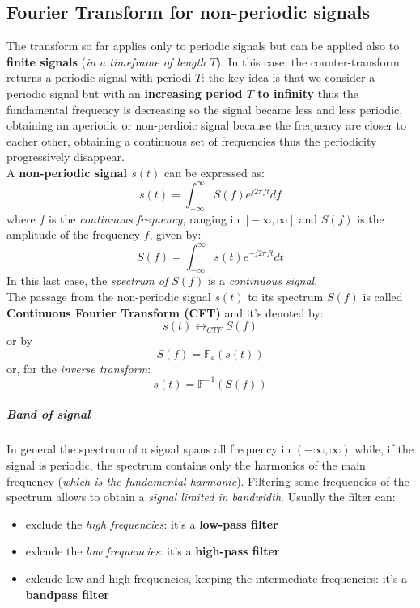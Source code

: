 \documentclass[10pt,a4paper]{report}
\theoremstyle{definition}
\begin{document}
\subsection{Fourier Transform for non-periodic signals}
The transform so far applies only to periodic signals but can be applied also to \textbf{finite signals} (\textit{in a timeframe of length $T$}). In this case, the counter-transform returns a periodic signal with periodi $T$: the key idea is that we consider a periodic signal but with an \textbf{increasing period $T$ to infinity} thus the fundamental frequency is decreasing so the signal became less and less periodic, obtaining an aperiodic or non-perdioic signal because the frequency are closer to eacher other, obtaining a continuous set of frequencies thus the periodicity progressively disappear.\\
A \textbf{non-periodic signal $s(t)$} can be expressed as:
\begin{equation}
	s(t) = \int_{-\infty}^{\infty} S(f)e^{j2\pi ft}df
\end{equation}
where $f$ is the \textit{continuous frequency}, ranging in $[-\infty, \infty]$ and $S(f)$ is the amplitude of the frequency $f$, given by:
\begin{equation}
	S(f) = \int_{-\infty}^{\infty} s(t)e^{-j2\pi ft} dt
\end{equation}
In this last case, the \textit{spectrum of $S(f)$} is a \textit{continuous signal}.\\
The passage from the non-periodic signal $s(t)$ to its spectrum $S(f)$ is called \textbf{Continuous Fourier Transform (CFT)} and it's denoted by:
\begin{equation}
	s(t) \longleftrightarrow_{CTF} S(f)
\end{equation}
or by 
\begin{equation}
	S(f) = \mathbb{F_{c}}(s(t))
\end{equation}
or, for the \textit{inverse transform}:
\begin{equation}
		s(t) = \mathbb{F}^{-1}(S(f))
\end{equation}

\subparagraph{Band of signal}
In general the spectrum of a signal spans all frequency in $(-\infty, \infty)$ while, if the signal is periodic, the spectrum contains only the harmonics of the main frequency (\textit{which is the fundamental harmonic}). 
Filtering some frequencies of the spectrum allows to obtain a \textit{signal limited in bandwidth}. Usually the filter can:
\begin{itemize}
	\item exclude the \textit{high frequencies}: it's a \textbf{low-pass filter}
	
	\item exlcude the \textit{low frequencies}: it's a \textbf{high-pass filter}
	
	\item exlcude low and high frequencies, keeping the intermediate frequencies: it's a \textbf{bandpass filter}
\end{itemize}
\end{document}
